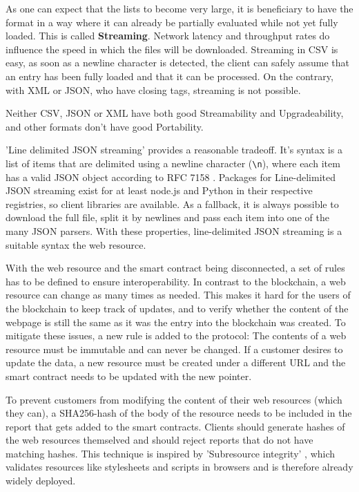 As one can expect that the lists to become very large, it is beneficiary to have the format in a way where it can already be partially evaluated while not yet fully loaded. This is called \textbf{Streaming}. Network latency and throughput rates do influence the speed in which the files will be downloaded.
Streaming in CSV is easy, as soon as a newline character is detected, the client can safely assume that an entry has been fully loaded and that it can be processed. On the contrary, with XML or JSON, who have closing tags, streaming is not possible.

Neither CSV, JSON or XML have both good Streamability and Upgradeability, and other formats don't have good Portability.

'Line delimited JSON streaming' \cite{LineDelimitedJSON} provides a reasonable tradeoff. It's syntax is a list of items that are delimited using a newline character (\texttt{{\textbackslash}n}), where each item has a valid JSON object according to RFC 7158 \cite{RFC7158}. Packages for Line-delimited JSON streaming exist for at least node.js and Python in their respective registries, so client libraries are available. As a fallback, it is always possible to download the full file, split it by newlines and pass each item into one of the many JSON parsers.
With these properties, line-delimited JSON streaming is a suitable syntax the web resource.

With the web resource and the smart contract being disconnected, a set of rules has to be defined to ensure interoperability. In contrast to the blockchain, a web resource can change as many times as needed. This makes it hard for the users of the blockchain to keep track of updates, and to verify whether the content of the webpage is still the same as it was the entry into the blockchain was created. To mitigate these issues, a new rule is added to the protocol: The contents of a web resource must be immutable and can never be changed. If a customer desires to update the data, a new resource must be created under a different URL and the smart contract needs to be updated with the new pointer.

To prevent customers from modifying the content of their web resources (which they can), a SHA256-hash of the body of the resource needs to be included in the report that gets added to the smart contracts. Clients should generate hashes of the web resources themselved and should reject reports that do not have matching hashes.
This technique is inspired by 'Subresource integrity' \cite{SubresourceIntegrity}, which validates resources like stylesheets and scripts in browsers and is therefore already widely deployed.

